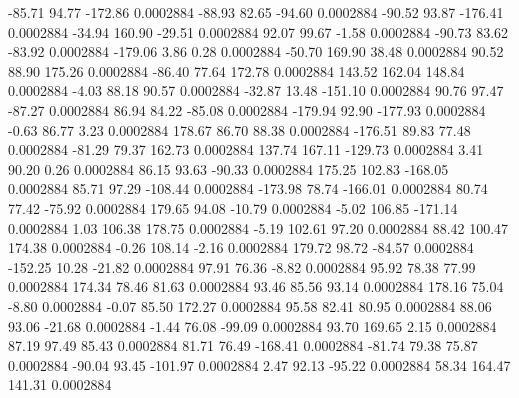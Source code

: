       -85.71       94.77     -172.86     0.0002884
      -88.93       82.65      -94.60     0.0002884
      -90.52       93.87     -176.41     0.0002884
      -34.94      160.90      -29.51     0.0002884
       92.07       99.67       -1.58     0.0002884
      -90.73       83.62      -83.92     0.0002884
     -179.06        3.86        0.28     0.0002884
      -50.70      169.90       38.48     0.0002884
       90.52       88.90      175.26     0.0002884
      -86.40       77.64      172.78     0.0002884
      143.52      162.04      148.84     0.0002884
       -4.03       88.18       90.57     0.0002884
      -32.87       13.48     -151.10     0.0002884
       90.76       97.47      -87.27     0.0002884
       86.94       84.22      -85.08     0.0002884
     -179.94       92.90     -177.93     0.0002884
       -0.63       86.77        3.23     0.0002884
      178.67       86.70       88.38     0.0002884
     -176.51       89.83       77.48     0.0002884
      -81.29       79.37      162.73     0.0002884
      137.74      167.11     -129.73     0.0002884
        3.41       90.20        0.26     0.0002884
       86.15       93.63      -90.33     0.0002884
      175.25      102.83     -168.05     0.0002884
       85.71       97.29     -108.44     0.0002884
     -173.98       78.74     -166.01     0.0002884
       80.74       77.42      -75.92     0.0002884
      179.65       94.08      -10.79     0.0002884
       -5.02      106.85     -171.14     0.0002884
        1.03      106.38      178.75     0.0002884
       -5.19      102.61       97.20     0.0002884
       88.42      100.47      174.38     0.0002884
       -0.26      108.14       -2.16     0.0002884
      179.72       98.72      -84.57     0.0002884
     -152.25       10.28      -21.82     0.0002884
       97.91       76.36       -8.82     0.0002884
       95.92       78.38       77.99     0.0002884
      174.34       78.46       81.63     0.0002884
       93.46       85.56       93.14     0.0002884
      178.16       75.04       -8.80     0.0002884
       -0.07       85.50      172.27     0.0002884
       95.58       82.41       80.95     0.0002884
       88.06       93.06      -21.68     0.0002884
       -1.44       76.08      -99.09     0.0002884
       93.70      169.65        2.15     0.0002884
       87.19       97.49       85.43     0.0002884
       81.71       76.49     -168.41     0.0002884
      -81.74       79.38       75.87     0.0002884
      -90.04       93.45     -101.97     0.0002884
        2.47       92.13      -95.22     0.0002884
       58.34      164.47      141.31     0.0002884
